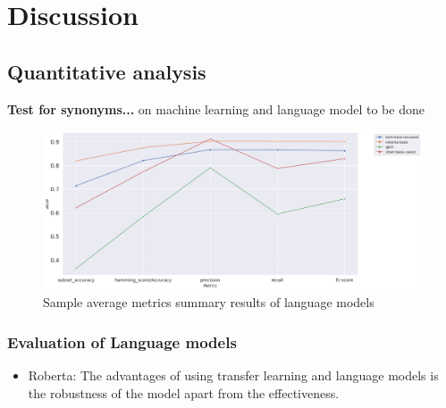 \chapter{Discussion}

\section{Quantitative analysis}


\textbf{Test for synonyms...} on machine learning and language model to be done
\begin{figure}[h!]
    \centering
    \includegraphics[width=1\textwidth]{thesis/figures/summary.png}
    \caption{Sample average metrics summary results of language models }
    \label{fig:model_wise_group_LM}
\end{figure}
\subsection{Evaluation of Language models}
\begin{itemize}
    \item Roberta: The advantages of using transfer learning and language models is the robustness of the model apart from the effectiveness.
\end{itemize}

